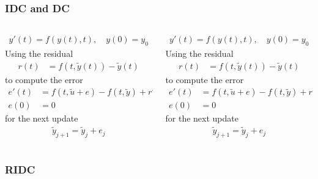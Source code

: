 \documentclass[%
  english,
  hyperref={pdfpagelabels=false},
  aspectratio=1610]{beamer}
\begin{document}
\begin{frame}
  \frametitle{IDC and DC}

  \begin{columns}[T]
    \begin{column}{6cm}
    \begin{align*}
      y'(t) = f\left( y\left( t \right),t \right),\quad y\left( 0 \right)= y_{0}
    \end{align*}
    Using the residual
    \begin{align*}
	r(t) &= f\left( t, \tilde y\left( t \right) \right) - \tilde y\left( t \right)
      \end{align*}
    to compute the error
    \begin{align*}
	e'(t) &= f(t,\tilde u + e) - f\left( t, \tilde y \right) + r'\left( t \right)\\
	e(0)  &= 0
    \end{align*}
    for the next update
    \begin{align*}
      \tilde y_{j+1} = \tilde y_{j} + e_{j}
    \end{align*}
    

    \end{column}
    \begin{column}{6cm}
    
     \begin{align*}
      y'(t) = f\left( y\left( t \right),t \right),\quad y\left( 0 \right)= y_{0}
    \end{align*}
    Using the residual
    \begin{align*}
	r(t) &= f\left( t, \tilde y\left( t \right) \right) - \tilde y\left( t \right)
      \end{align*}
    to compute the error
    \begin{align*}
	e'(t) &= f(t,\tilde u + e) - f\left( t, \tilde y \right) + r'\left( t \right)\\
	e(0)  &= 0
    \end{align*}
    for the next update
    \begin{align*}
      \tilde y_{j+1} = \tilde y_{j} + e_{j}
    \end{align*}
    



  \end{column}
\end{columns}


\end{frame}

\begin{frame}
  \frametitle{RIDC}
\end{frame}
\end{document}
